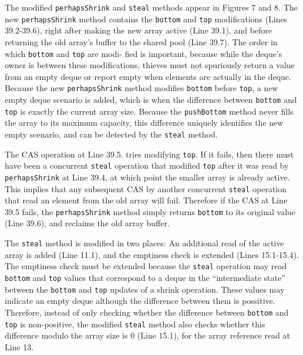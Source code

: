 The modified \lstinline!perhapsShrink! and \lstinline!steal! methods
appear in Figures 7 and 8. The new \lstinline!perhapsShrink! method
contains the \lstinline!bottom! and \lstinline!top! modifications
(Lines 39.2-39.6), right after making the new array active (Line
39.1), and before returning the old array's buffer to the shared pool
(Line 39.7). The order in which \lstinline!bottom! and \lstinline!top!
are modi- fied is important, because while the deque's owner is
between these modifications, thieves must not spuriously return a
value from an empty deque or report empty when elements are actually
in the deque. Because the new \lstinline!perhapsShrink! method
modifies \lstinline!bottom! before \lstinline!top!, a new empty deque
scenario is added, which is when the difference between
\lstinline!bottom! and \lstinline!top! is exactly the current array
size. Because the \lstinline!pushBottom! method never fills the array
to its maximum capacity, this difference uniquely identifies the new
empty scenario, and can be detected by the \lstinline!steal! method.

The CAS operation at Line 39.5. tries modifying \lstinline!top!. If it
fails, then there must have been a concurrent \lstinline!steal!
operation that modified \lstinline!top! after it was read by
\lstinline!perhapsShrink! at Line 39.4, at which point the smaller
array is already active. This implies that any subsequent CAS by
another concurrent \lstinline!steal! operation that read an element
from the old array will fail. Therefore if the CAS at Line 39.5 fails,
the \lstinline!perhapsShrink! method simply returns \lstinline!bottom!
to its original value (Line 39.6), and reclaims the old array buffer.

The \lstinline!steal! method is modified in two places: An additional
read of the active array is added (Line 11.1), and the emptiness check
is extended (Lines 15.1-15.4). The emptiness check must be extended
because the \lstinline!steal! operation may read \lstinline!bottom!
and \lstinline!top! values that correspond to a deque in the
``intermediate state'' between the \lstinline!bottom! and
\lstinline!top! updates of a shrink operation. These values may
indicate an empty deque although the difference between them is
possitive. Therefore, instead of only checking whether the difference
between \lstinline!bottom! and \lstinline!top! is non-positive, the
modified \lstinline!steal! method also checks whether this difference
modulo the array size is 0 (Line 15.1), for the array reference read
at Line 13.

